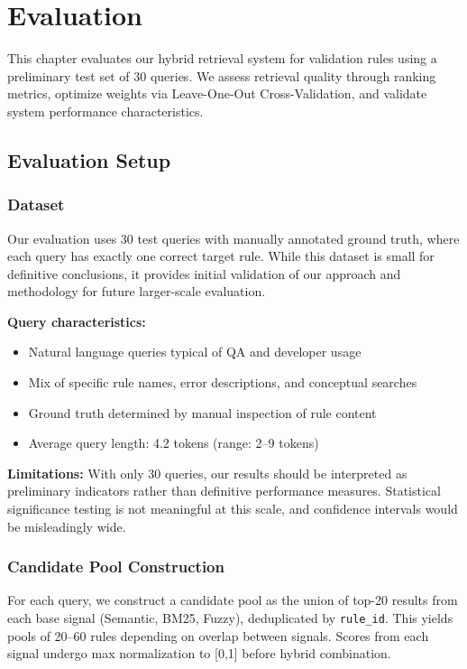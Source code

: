 \chapter{Evaluation}
\label{chap:evaluation}

This chapter evaluates our hybrid retrieval system for validation rules using a preliminary test set of 30 queries. We assess retrieval quality through ranking metrics, optimize weights via Leave-One-Out Cross-Validation, and validate system performance characteristics.

\section{Evaluation Setup}
\label{sec:evaluation-setup}

\subsection{Dataset}

Our evaluation uses 30 test queries with manually annotated ground truth, where each query has exactly one correct target rule. While this dataset is small for definitive conclusions, it provides initial validation of our approach and methodology for future larger-scale evaluation.

\textbf{Query characteristics:}
\begin{itemize}[leftmargin=*,itemsep=2pt,topsep=2pt]
  \item Natural language queries typical of QA and developer usage
  \item Mix of specific rule names, error descriptions, and conceptual searches
  \item Ground truth determined by manual inspection of rule content
  \item Average query length: 4.2 tokens (range: 2–9 tokens)
\end{itemize}

\textbf{Limitations:} With only 30 queries, our results should be interpreted as preliminary indicators rather than definitive performance measures. Statistical significance testing is not meaningful at this scale, and confidence intervals would be misleadingly wide.

\subsection{Candidate Pool Construction}

For each query, we construct a candidate pool as the union of top-20 results from each base signal (Semantic, BM25, Fuzzy), deduplicated by \texttt{rule\_id}. This yields pools of 20–60 rules depending on overlap between signals. Scores from each signal undergo max normalization to [0,1] before hybrid combination.

